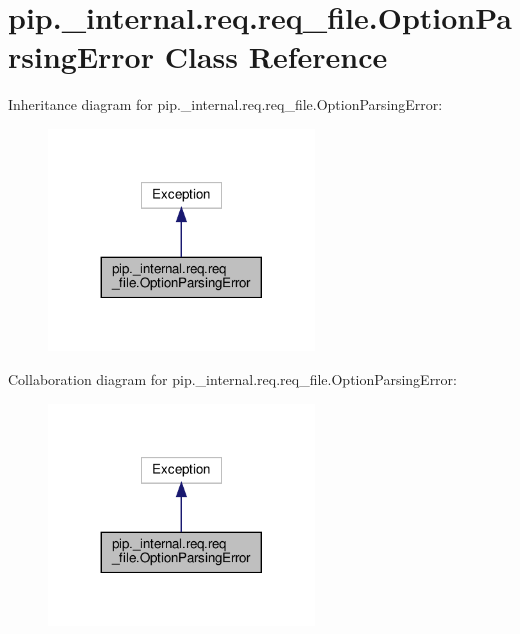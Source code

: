 \hypertarget{classpip_1_1__internal_1_1req_1_1req__file_1_1OptionParsingError}{}\section{pip.\+\_\+internal.\+req.\+req\+\_\+file.\+Option\+Parsing\+Error Class Reference}
\label{classpip_1_1__internal_1_1req_1_1req__file_1_1OptionParsingError}


Inheritance diagram for pip.\+\_\+internal.\+req.\+req\+\_\+file.\+Option\+Parsing\+Error\+:
\nopagebreak
\begin{figure}[H]
\begin{center}
\leavevmode
\includegraphics[width=200pt]{classpip_1_1__internal_1_1req_1_1req__file_1_1OptionParsingError__inherit__graph}
\end{center}
\end{figure}


Collaboration diagram for pip.\+\_\+internal.\+req.\+req\+\_\+file.\+Option\+Parsing\+Error\+:
\nopagebreak
\begin{figure}[H]
\begin{center}
\leavevmode
\includegraphics[width=200pt]{classpip_1_1__internal_1_1req_1_1req__file_1_1OptionParsingError__coll__graph}
\end{center}
\end{figure}

